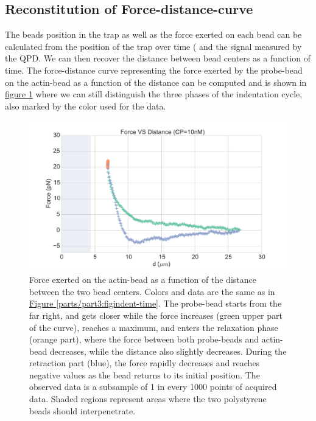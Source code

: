 \documentclass[A4paperpaper,11pt,english]{sphinxmanual}
\begin{document}
\subsection{Reconstitution of Force-distance-curve}
\label{parts/part3:reconstitution-of-force-distance-curve}
The beads position in the trap as well as the force exerted on each bead can be
calculated from the position of the trap over time ( and the signal measured by the QPD. We can then recover the distance between bead centers as a function
of time.  The force-distance curve representing the force exerted by the
probe-bead on the actin-bead as a function of the distance can be computed and is
shown in \hyperref[parts/part3:force-distance]{figure  \ref*{parts/part3:force-distance}} where we can still distinguish the three
phases of the indentation cycle, also marked by the color used for the data.
\begin{figure}[htbp]
\centering
\capstart

\includegraphics[width=0.800\linewidth]{force-distance.pdf}
\caption{Force exerted on the actin-bead as a function of the distance between the
two bead centers. Colors and data are the same as in \hyperref[parts/part3:figindent-time]{Figure  \ref*{parts/part3:figindent-time}}.
The probe-bead starts from the far right, and gets closer
while the force increases (green upper part of the curve), reaches a
maximum, and enters the relaxation phase (orange part), where the force
between both probe-beads and actin-bead decreases, while the distance  also
slightly decreases. During the retraction part (blue), the force rapidly
decreases and  reaches negative values as   the bead returns to its initial
position. The observed data is a subsample of 1 in every 1000 points of acquired
data. Shaded regions represent areas where the two polystyrene beads should
interpenetrate.}\label{parts/part3:force-distance}\end{figure}
\end{document}
